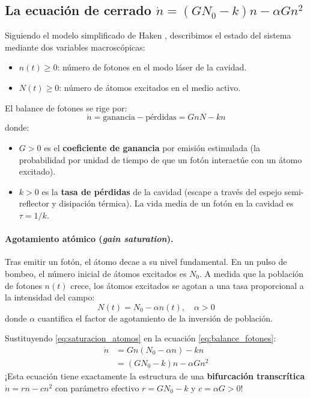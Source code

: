 \subsection{La ecuación de cerrado $\dot{n} = (GN_{0} - k)n - \alpha G n^{2}$}

Siguiendo el modelo simplificado de Haken \cite{haken1983}, describimos el estado del sistema mediante dos variables macroscópicas:
\begin{itemize}
    \item $n(t) \ge 0$: número de fotones en el modo láser de la cavidad.
    \item $N(t) \ge 0$: número de átomos excitados en el medio activo.
\end{itemize}

El balance de fotones se rige por:
\begin{equation}
    \dot{n} = \text{ganancia} - \text{pérdidas} = G n N - k n
    \label{eq:balance_fotones}
\end{equation}
donde:
\begin{itemize}
    \item $G > 0$ es el \textbf{coeficiente de ganancia} por emisión estimulada (la probabilidad por unidad de tiempo de que un fotón interactúe con un átomo excitado).
    \item $k > 0$ es la \textbf{tasa de pérdidas} de la cavidad (escape a través del espejo semi-reflector y disipación térmica). La vida media de un fotón en la cavidad es $\tau = 1/k$.
\end{itemize}

\paragraph{Agotamiento atómico (\emph{gain saturation}).}
Tras emitir un fotón, el átomo decae a su nivel fundamental. En un pulso de bombeo, el número inicial de átomos excitados es $N_0$. A medida que la población de fotones $n(t)$ crece, los átomos excitados se agotan a una tasa proporcional a la intensidad del campo:
\begin{equation}
    N(t) = N_0 - \alpha n(t), \quad \alpha > 0
    \label{eq:saturacion_atomos}
\end{equation}
donde $\alpha$ cuantifica el factor de agotamiento de la inversión de población.

Sustituyendo \eqref{eq:saturacion_atomos} en la ecuación \eqref{eq:balance_fotones}:
\begin{align}
    \dot{n} &= G n (N_0 - \alpha n) - k n \nonumber \\
    &= (G N_0 - k)n - \alpha G n^2
    \label{eq:laser_transcritica_ode}
\end{align}
¡Esta ecuación tiene exactamente la estructura de una \textbf{bifurcación transcrítica} $\dot{n} = r n - c n^2$ con parámetro efectivo $r = G N_0 - k$ y $c = \alpha G > 0$!

